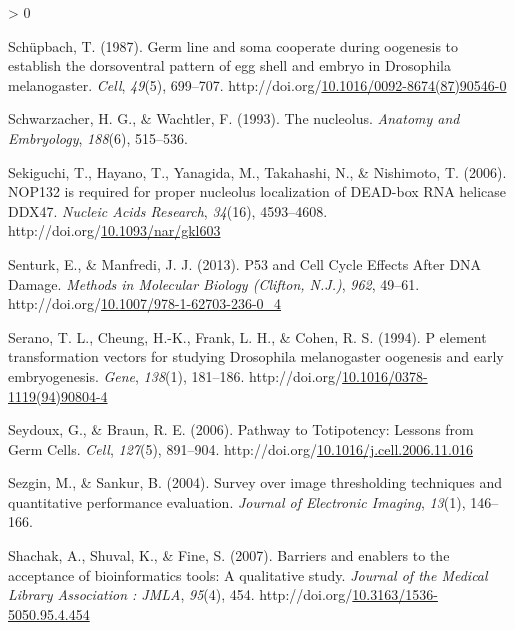\documentclass[12pt,oneside]{reedthesis}
\newlength{\cslhangindent}
\newenvironment{CSLReferences}[2] %
 {%
  \setlength{\parindent}{0pt}
  \ifodd #1 \everypar{\setlength{\hangindent}{\cslhangindent}}\ignorespaces\fi
  \ifnum #2 > 0
  \setlength{\parskip}{#2\baselineskip}
  \fi
 }%
 {}
\begin{document}
\begin{CSLReferences}{1}{0}
\leavevmode\hypertarget{ref-schupbachGermLineSoma1987}{}%
Schüpbach, T. (1987). Germ line and soma cooperate during oogenesis to establish the dorsoventral pattern of egg shell and embryo in {Drosophila} melanogaster. \emph{Cell}, \emph{49}(5), 699--707. http://doi.org/\href{https://doi.org/10.1016/0092-8674(87)90546-0}{10.1016/0092-8674(87)90546-0}

\leavevmode\hypertarget{ref-Schwarzacher1993}{}%
Schwarzacher, H. G., \& Wachtler, F. (1993). The nucleolus. \emph{Anatomy and Embryology}, \emph{188}(6), 515--536.

\leavevmode\hypertarget{ref-sekiguchiNOP132RequiredProper2006}{}%
Sekiguchi, T., Hayano, T., Yanagida, M., Takahashi, N., \& Nishimoto, T. (2006). {NOP132} is required for proper nucleolus localization of {DEAD-box RNA} helicase {DDX47}. \emph{Nucleic Acids Research}, \emph{34}(16), 4593--4608. http://doi.org/\href{https://doi.org/10.1093/nar/gkl603}{10.1093/nar/gkl603}

\leavevmode\hypertarget{ref-senturkP53CellCycle2013}{}%
Senturk, E., \& Manfredi, J. J. (2013). P53 and {Cell Cycle Effects After DNA Damage}. \emph{Methods in Molecular Biology (Clifton, N.J.)}, \emph{962}, 49--61. http://doi.org/\href{https://doi.org/10.1007/978-1-62703-236-0_4}{10.1007/978-1-62703-236-0\_4}

\leavevmode\hypertarget{ref-seranoElementTransformationVectors1994}{}%
Serano, T. L., Cheung, H.-K., Frank, L. H., \& Cohen, R. S. (1994). P element transformation vectors for studying {Drosophila} melanogaster oogenesis and early embryogenesis. \emph{Gene}, \emph{138}(1), 181--186. http://doi.org/\href{https://doi.org/10.1016/0378-1119(94)90804-4}{10.1016/0378-1119(94)90804-4}

\leavevmode\hypertarget{ref-Seydoux2006}{}%
Seydoux, G., \& Braun, R. E. (2006). Pathway to {Totipotency}: {Lessons} from {Germ Cells}. \emph{Cell}, \emph{127}(5), 891--904. http://doi.org/\href{https://doi.org/10.1016/j.cell.2006.11.016}{10.1016/j.cell.2006.11.016}

\leavevmode\hypertarget{ref-sezginSurveyImageThresholding2004}{}%
Sezgin, M., \& Sankur, B. (2004). Survey over image thresholding techniques and quantitative performance evaluation. \emph{Journal of Electronic Imaging}, \emph{13}(1), 146--166.

\leavevmode\hypertarget{ref-shachakBarriersEnablersAcceptance2007}{}%
Shachak, A., Shuval, K., \& Fine, S. (2007). Barriers and enablers to the acceptance of bioinformatics tools: A qualitative study. \emph{Journal of the Medical Library Association : JMLA}, \emph{95}(4), 454. http://doi.org/\href{https://doi.org/10.3163/1536-5050.95.4.454}{10.3163/1536-5050.95.4.454}


\end{CSLReferences}
\end{document}
